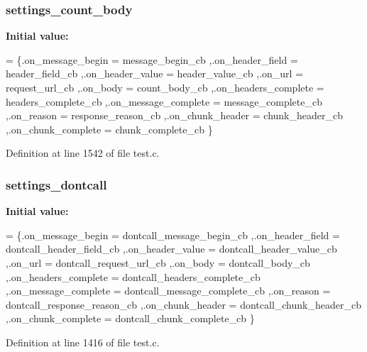 \subsubsection[{settings\+\_\+count\+\_\+body}]{ settings\+\_\+count\+\_\+body\hspace{0.3cm}{\ttfamily [static]}}\label{test_8c_a864394f0decf4fa58a45fe46a1a40780}
{\bfseries Initial value\+:}
\begin{DoxyCode}
=
  \{.on\_message\_begin = message_begin_cb
  ,.on\_header\_field = header_field_cb
  ,.on\_header\_value = header_value_cb
  ,.on\_url = request_url_cb
  ,.on\_body = count_body_cb
  ,.on\_headers\_complete = headers_complete_cb
  ,.on\_message\_complete = message_complete_cb
  ,.on\_reason = response_reason_cb
  ,.on\_chunk\_header = chunk_header_cb
  ,.on\_chunk\_complete = chunk_complete_cb
  \}
\end{DoxyCode}


Definition at line 1542 of file test.\+c.

\subsubsection[{settings\+\_\+dontcall}]{ settings\+\_\+dontcall\hspace{0.3cm}{\ttfamily [static]}}\label{test_8c_a17009fe0777ccb98c24492cc19868d03}
{\bfseries Initial value\+:}
\begin{DoxyCode}
=
  \{.on\_message\_begin = dontcall_message_begin_cb
  ,.on\_header\_field = dontcall_header_field_cb
  ,.on\_header\_value = dontcall_header_value_cb
  ,.on\_url = dontcall_request_url_cb
  ,.on\_body = dontcall_body_cb
  ,.on\_headers\_complete = dontcall_headers_complete_cb
  ,.on\_message\_complete = dontcall_message_complete_cb
  ,.on\_reason = dontcall_response_reason_cb
  ,.on\_chunk\_header = dontcall_chunk_header_cb
  ,.on\_chunk\_complete = dontcall_chunk_complete_cb
  \}
\end{DoxyCode}


Definition at line 1416 of file test.\+c.



